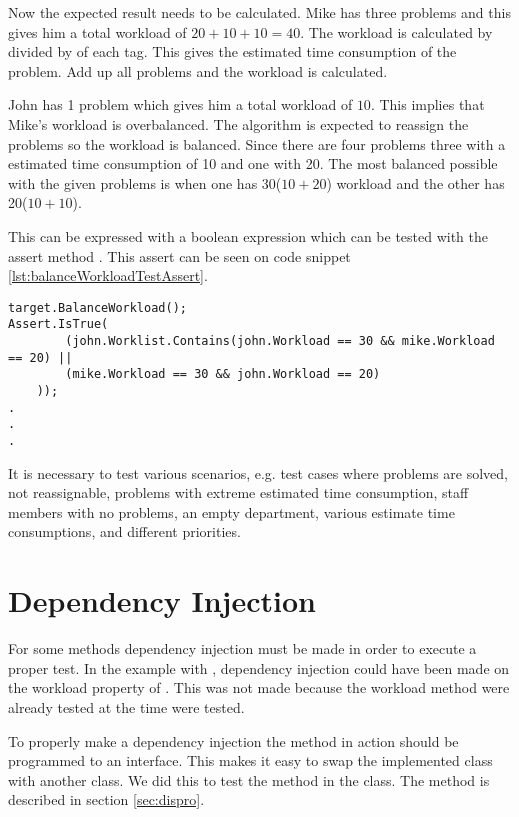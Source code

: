 Now the expected result needs to be calculated. 
Mike has three problems and this gives him a total workload of $20 + 10 + 10 = 40$. The workload is calculated by  divided by  of each tag.
This gives the estimated time consumption of the problem. Add up all problems and the workload is calculated.

John has 1 problem which gives him a total workload of $10$. 
This implies that Mike's workload is overbalanced. 
The algorithm is expected to reassign the problems so the workload is balanced. 
Since there are four problems three with a estimated time consumption of 10 and one with 20.
The most balanced possible with the given problems is when one has 30($10 + 20$) workload and the other has 20($10 + 10$). 

This can be expressed with a boolean expression which can be tested with the assert method . 
This assert can be seen on code snippet \ref{lst:balanceWorkloadTestAssert}.

\begin{lstlisting}[style=sourceCode, caption=\myCaption{An example unit test which tests a specific instance of the balanceWorkload method.}, label=lst:balanceWorkloadTestAssert,name=src:balance]
target.BalanceWorkload();
Assert.IsTrue(
		(john.Worklist.Contains(john.Workload == 30 && mike.Workload == 20) ||
		(mike.Workload == 30 && john.Workload == 20)
	));
.
.
.
\end{lstlisting}

It is necessary to test various scenarios, e.g. test cases where problems are solved, not reassignable, problems with extreme estimated time consumption, staff members with no problems, an empty department, various estimate time consumptions, and different priorities. 

\section{Dependency Injection}
\label{sec:independencyInjection}
For some methods dependency injection must be made in order to execute a proper test. 
In the example with , dependency injection could have been made on the workload property of . 
This was not made because the workload method were already tested at the time  were tested.

To properly make a dependency injection the method in action should be programmed to an interface. 
This makes it easy to swap the implemented class with another class. 
We did this to test the method  in the  class. 
The method is described in section \ref{sec:dispro}.

